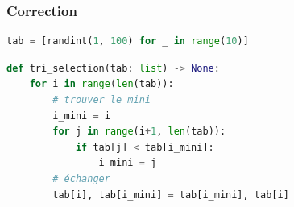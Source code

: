 \documentclass[svgnames,11pt]{beamer}
\begin{document}
\begin{frame}[fragile]
    \frametitle{Correction}
    \begin{center}
        \begin{lstlisting}[language=Python , basicstyle=\ttfamily\small, xleftmargin=1em, xrightmargin=1em]
tab = [randint(1, 100) for _ in range(10)]
\end{lstlisting}
        \begin{lstlisting}[language=Python , basicstyle=\ttfamily\small, xleftmargin=1em, xrightmargin=1em]
def tri_selection(tab: list) -> None:
    for i in range(len(tab)):
        # trouver le mini
        i_mini = i
        for j in range(i+1, len(tab)):
            if tab[j] < tab[i_mini]:
                i_mini = j
        # échanger
        tab[i], tab[i_mini] = tab[i_mini], tab[i]
\end{lstlisting}
    \end{center}

\end{frame}
\end{document}

